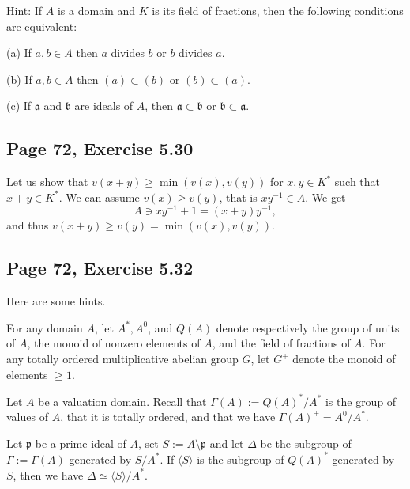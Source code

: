 \documentclass[parskip=half,fontsize=12pt]{scrartcl}%
\newcommand{\mf}{\mathfrak}
\newcommand{\aaa}{\mf a}
\newcommand{\bbb}{\mf b}
\newcommand{\ppp}{\mf p}
\begin{document}
Hint: If $A$ is a domain and $K$ is its field of fractions, then the following conditions are equivalent:

(a) If $a,b\in A$ then $a$ divides $b$ or $b$ divides $a$.

(b) If $a,b\in A$ then $(a)\subset(b)$ or $(b)\subset(a)$.

(c) If $\aaa$ and $\bbb$ are ideals of $A$, then $\aaa\subset\bbb$ or $\bbb\subset\aaa$.

\subsection{Page 72, Exercise 5.30}%

Let us show that $v(x+y)\ge\min(v(x),v(y))$ for $x,y\in K^*$ such that $x+y\in K^*$. We can assume $v(x)\ge v(y)$, that is $xy^{-1}\in A$. We get 
$$
A\ni xy^{-1}+1=(x+y)y^{-1},
$$ 
and thus $v(x+y)\ge v(y)=\min(v(x),v(y))$.

\subsection{Page 72, Exercise 5.32}%

Here are some hints.

For any domain $A$, let $A^*,A^0$, and $Q(A)$ denote respectively the group of units of $A$, the monoid of nonzero elements of $A$, and the field of fractions of $A$. For any totally ordered multiplicative abelian group $G$, let $G^+$ denote the monoid of elements $\ge1$. 

Let $A$ be a valuation domain. Recall that $\Gamma(A):=Q(A)^*/A^*$ is the group of values of $A$, that it is totally ordered, and that we have $\Gamma(A)^+=A^0/A^*$. 

Let $\ppp$ be a prime ideal of $A$, set $S:=A\setminus\ppp$ and let $\Delta$ be the subgroup of $\Gamma:=\Gamma(A)$ generated by $S/A^*$. If $\langle S\rangle$ is the subgroup of $Q(A)^*$ generated by $S$, then we have $\Delta\simeq\langle S\rangle/A^*$.
\end{document}
